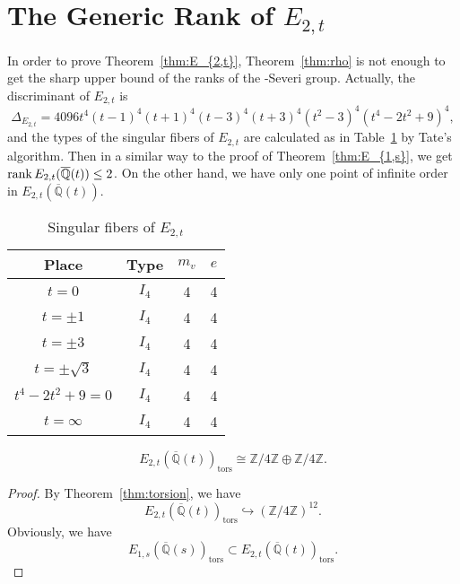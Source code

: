 \documentclass[main]{subfiles}
\begin{document}
\section{The Generic Rank of \texorpdfstring{$E_{2,t}$}{E2,t}}

In order to prove Theorem~\ref{thm:E_{2,t}}, Theorem~\ref{thm:rho} is not enough to get the sharp upper bound of the ranks of the \Neron-Severi group.
Actually, the discriminant of $E_{2,t}$ is
\begin{equation*}
    \Delta_{E_{2,t}} = 4096t^{4}(t - 1)^{4}(t + 1)^{4}(t - 3)^{4}(t + 3)^{4}(t^{2} - 3)^{4}(t^{4} - 2t^{2} + 9)^{4},
\end{equation*}
and the types of the singular fibers of $E_{2,t}$ are calculated as in Table~\ref{tab:E_{2,t}} by Tate's algorithm.
Then in a similar way to the proof of Theorem~\ref{thm:E_{1,s}}, we get $\operatorname{rank} E_{2,t}(\overline{\mathbb{Q}}(t)) \leq 2$.
On the other hand, we have only one point of infinite order in $E_{2,t}(\overline{\mathbb{Q}}(t))$.
\begin{table}[H]
    \centering
    \caption{Singular fibers of $E_{2,t}$}
    \begin{tabular}{|c|c|c|c|}
        \hline
        Place            & Type  & $m_v$ & $e$ \\
        \hline
        $t=0$            & $I_4$ & 4     & 4   \\
        $t=\pm 1$        & $I_4$ & 4     & 4   \\
        $t=\pm 3$        & $I_4$ & 4     & 4   \\
        $t=\pm \sqrt{3}$ & $I_4$ & 4     & 4   \\
        $t^4-2t^2+9=0$   & $I_4$ & 4     & 4   \\
        $t=\infty$       & $I_4$ & 4     & 4   \\
        \hline
    \end{tabular}
    \label{tab:E_{2,t}}
\end{table}

\begin{lem}
    \begin{equation*}
        E_{2,t}(\overline{\mathbb{Q}}(t))_{\text{tors}} \cong \mathbb{Z} / 4 \mathbb{Z} \oplus \mathbb{Z} / 4 \mathbb{Z}.
    \end{equation*}
\end{lem}
\begin{proof}
    By Theorem~\ref{thm:torsion}, we have
    \begin{equation*}
        E_{2,t}(\overline{\mathbb{Q}}(t))_{\text{tors}} \hookrightarrow (\mathbb{Z} / 4 \mathbb{Z})^{12}.
    \end{equation*}
    Obviously, we have
    \begin{equation*}
        E_{1,s}(\overline{\mathbb{Q}}(s))_{\text{tors}} \subset E_{2,t}(\overline{\mathbb{Q}}(t))_{\text{tors}}.
    \end{equation*}
\end{proof}
\end{document}
